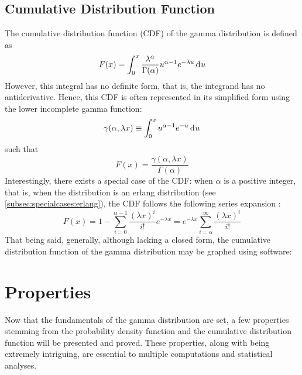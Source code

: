 \documentclass[12pt]{article}
\begin{document}
\subsection{Cumulative Distribution Function}\label{subsec:gamma:cdf} The cumulative distribution
function (CDF) of the gamma distribution is defined as
\begin{equation}
	F(x) = \int^x_0\frac{\lambda^\alpha}{\Gamma(\alpha)}u^{\alpha-1}e^{-\lambda u}\mathop{}\!\mathrm{d^{}}u
\end{equation}
However, this integral has no definite form, that is, the integrand has no antiderivative. Hence, this CDF is often
represented in its simplified form using the lower incomplete gamma function\cite{weissteinIncompleteGammaFunction}:
\begin{equation}
	\gamma(\alpha, \lambda x)\equiv\int^x_0u^{\alpha-1}e^{-u}\mathop{}\!\mathrm{d^{}}u
\end{equation}
such that
\begin{equation}
	F(x) = \frac{\gamma(\alpha, \lambda x)}{\Gamma(\alpha)}
\end{equation}
Interestingly, there exists a special case of the CDF: when $\alpha$ is a positive integer, that is, when the distribution
is an erlang distribution (see \autoref{subsec:specialcases:erlang}), the CDF follows the following series expansion
\cite{wikipediaGammaDistribution2022}:
\begin{equation}
	F(x) = 1-\sum^{\alpha-1}_{i=0}\frac{(\lambda x)^i}{i!}e^{-\lambda x} = e^{-\lambda x}\sum^\infty_{i=\alpha}\frac{(\lambda x)^i}{i!}
\end{equation}
That being said, generally, although lacking a closed form, the cumulative distribution function of the gamma
distribution may be graphed using software:


\pagebreak
\section{Properties}
Now that the fundamentals of the gamma distribution are set, a few properties stemming from the probability density
function and the cumulative distribution function will be presented and proved. These properties, along
with being extremely intriguing, are essential to multiple computations and statistical analyses.
\end{document}
